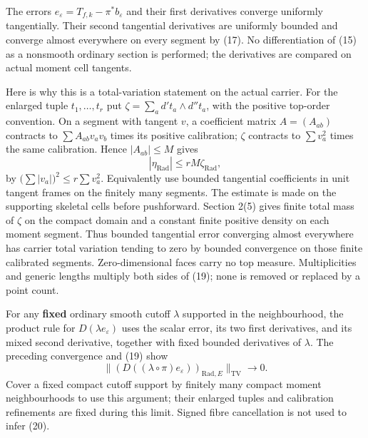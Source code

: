 \documentclass[11pt]{article}
\begin{document}
The errors \(e_\varepsilon=T_{f,k}-\pi^*b_\varepsilon\) and their first
derivatives converge uniformly tangentially. Their second tangential
derivatives are uniformly bounded and converge almost everywhere on
every segment by (17). No differentiation of (15) as a nonsmooth
ordinary section is performed; the derivatives are compared on actual
moment cell tangents.

Here is why this is a total-variation statement on the actual carrier.
For the enlarged tuple \(t_1,\ldots,t_r\) put
\(\zeta=\sum_a d't_a\wedge d''t_a\), with the positive top-order
convention. On a segment with tangent \(v\), a coefficient matrix
\(A=(A_{ab})\) contracts to \(\sum A_{ab}v_av_b\) times its positive
calibration; \(\zeta\) contracts to \(\sum v_a^2\) times the same
calibration. Hence \(|A_{ab}|\le M\) gives \[
       |\eta_{\mathrm{Rad}}|\le rM\zeta_{\mathrm{Rad}},    \tag{19}
\] by \(\big(\sum|v_a|\big)^2\le r\sum v_a^2\). Equivalently use bounded
tangential coefficients in unit tangent frames on the finitely many
segments. The estimate is made on the supporting skeletal cells before
pushforward. Section 2(5) gives finite total mass of \(\zeta\) on the
compact domain and a constant finite positive density on each moment
segment. Thus bounded tangential error converging almost everywhere has
carrier total variation tending to zero by bounded convergence on those
finite calibrated segments. Zero-dimensional faces carry no top measure.
Multiplicities and generic lengths multiply both sides of (19); none is
removed or replaced by a point count.

For any \textbf{fixed} ordinary smooth cutoff \(\lambda\) supported in
the neighbourhood, the product rule for \(D(\lambda e_\varepsilon)\)
uses the scalar error, its two first derivatives, and its mixed second
derivative, together with fixed bounded derivatives of \(\lambda\). The
preceding convergence and (19) show \[
       \big\|(D((\lambda\circ\pi)e_\varepsilon))_{
                          \mathrm{Rad},E}\big\|_{\mathrm{TV}}
                                 \longrightarrow0.       \tag{20}
\] Cover a fixed compact cutoff support by finitely many compact moment
neighbourhoods to use this argument; their enlarged tuples and
calibration refinements are fixed during this limit. Signed fibre
cancellation is not used to infer (20).
\end{document}

